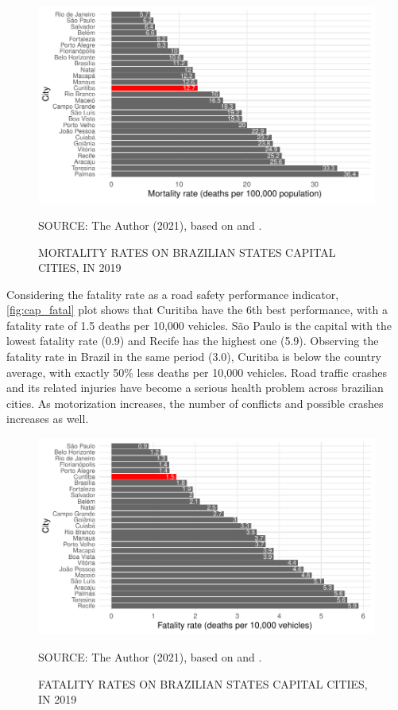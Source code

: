 \begin{figure}[!htbp]
    \centering\footnotesize
    \captionsetup{font=footnotesize}
    \caption{MORTALITY RATES ON BRAZILIAN STATES CAPITAL CITIES, IN 2019}
    \includegraphics{fig/cap_mort.pdf}
    \label{fig:cap_mort}
    \par SOURCE: The Author (2021), based on \textcite{MinistryofHealth2020} and \textcite{MinistryofHealth2021}.
\end{figure}  

Considering the fatality rate as a road safety performance indicator, \autoref{fig:cap_fatal} plot shows that Curitiba have the 6th best performance, with a fatality rate of 1.5 deaths per 10,000 vehicles. São Paulo is the capital with the lowest fatality rate (0.9) and Recife has the highest one (5.9). Observing the fatality rate in Brazil in the same period (3.0), Curitiba is below the country average, with exactly 50\% less deaths per 10,000 vehicles. Road traffic crashes and its related injuries have become a serious health problem across brazilian cities. As motorization increases, the number of conflicts and possible crashes increases as well.

\begin{figure}[!htbp]
    \centering\footnotesize
    \captionsetup{font=footnotesize}
    \caption{FATALITY RATES ON BRAZILIAN STATES CAPITAL CITIES, IN 2019}
    \includegraphics{fig/cap_fatal.pdf}
    \label{fig:cap_fatal}
    \par SOURCE: The Author (2021), based on \textcite{MinistryofHealth2020} and \textcite{DENATRAN2020}.
\end{figure} 


